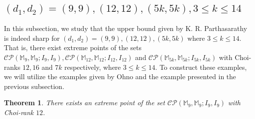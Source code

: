 \documentclass[10pt,reqno]{amsart}
\theoremstyle{definition}
\theoremstyle{plain}
\newtheorem{thm}[defn]{Theorem}
\theoremstyle{remark}
\newcommand{\mbb}[1]{\mathbb{#1}}
\newcommand{\msc}[1]{\mathscr{#1}}
\newcommand{\M}[1]{\mbb{M}_{#1}}%
\numberwithin{equation}{section}%
\begin{document}
\begin{center}
	\item \subsection{ $(d_1,d_2)=(9,9), (12,12), (5k,5k), 3\leq k\leq 14 $}
\end{center}


In this subsection, we study that the upper bound given by K. R. Parthasarathy is indeed sharp for $(d_1,d_2)=(9,9), (12,12), (5k,5k) \text{ where } 3\leq k\leq 14 $. That is, there exist extreme points of the sets $\msc{CP}(\M{9},\M{9}; I_{9}, I_{9}), \msc{CP}(\M{12},\M{12}; I_{12}, I_{12})$ and $\msc{CP}(\M{5k},\M{5k}; I_{5k}, I_{5k})$ with Choi-ranks $12, 16$ and $7k$ respectively, where $3\leq k\leq 14$. To construct these examples, we will utilize the examples given by Ohno \cite{Ohno10} and the example presented in the previous subsection.



\begin{thm}\label{thm-krpbound-M9}
	There exists an extreme point of the set  $\msc{CP}(\M{9},\M{9}; I_{9},I_{9})$ with Choi-rank $12$. 
\end{thm} 
\end{document}
